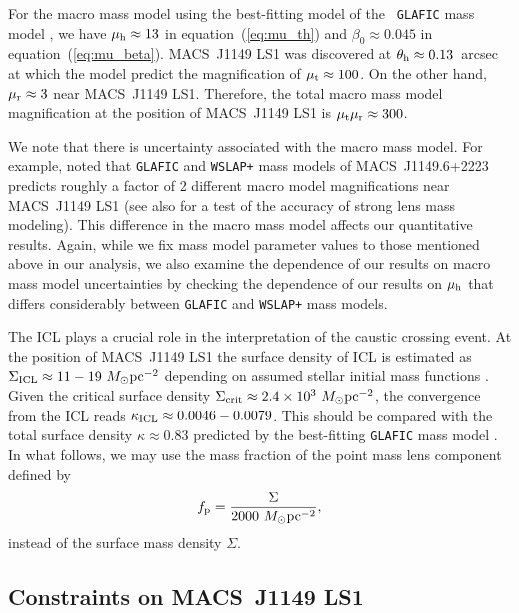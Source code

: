 \documentclass[showpacs,twocolumn,preprintnumbers,amsmath,amssymb,superscriptaddress,nofootinbib]{revtex4}
\newcommand{\morv}[1]{#1}
\begin{document}
For the macro mass model using the best-fitting model of the {\tt
  GLAFIC} mass model \cite{Oguri:2010rh,Kawamata:2015haa}, we have
$\mu_{\rm h}\approx 13$ in equation~(\ref{eq:mu_th}) and
$\beta_0\approx 0.045$ in equation~(\ref{eq:mu_beta}). MACS~J1149 LS1
was discovered at $\theta_{\rm h}\approx 0.13$~arcsec at which the
model predict the magnification of $\mu_{\rm t}\approx 100$. On the
other hand, $\mu_{\rm r}\approx 3$ near  MACS~J1149 LS1.
Therefore, the total macro mass model magnification at the position of
MACS~J1149 LS1 is $\mu_{\rm t}\mu_{\rm r}\approx 300$.

\morv{We note that there is uncertainty associated with the macro mass
  model. For example, \cite{Diego:2017drh} noted that {\tt GLAFIC} and
  {\tt WSLAP+} \cite{Diego:2015lla} mass models of MACS~J1149.6+2223
  predicts roughly a factor of 2 different macro model magnifications
  near MACS~J1149 LS1 (see also \cite{Meneghetti:2016hcr} for a test
  of the accuracy of strong lens mass modeling). This difference in
  the macro mass model affects our quantitative results. Again, while
  we fix mass model parameter values to those mentioned above in our
  analysis, we also examine the dependence of our results on macro mass
  model uncertainties by checking the dependence of our results on
  $\mu_{\rm h}$ that differs considerably between  {\tt GLAFIC} and
  {\tt WSLAP+} mass models. } 

The ICL plays a crucial role in the interpretation of the caustic
crossing event. At the position of MACS~J1149 LS1 the surface density
of ICL is estimated as $\Sigma_{\rm ICL}\approx 11-19~M_\odot{\rm
  pc}^{-2}$ depending on assumed stellar initial mass functions
\citep{Kelly:2017fps,Morishita:2017aaa}. Given the critical surface
  density $\Sigma_{\rm crit}\approx 2.4\times 10^3~M_\odot{\rm pc}^{-2}$,
the convergence from the ICL reads $\kappa_{\rm ICL}\approx 0.0046 - 0.0079$. 
This should be compared with the total surface density $\kappa\approx
0.83$ predicted by the best-fitting {\tt GLAFIC} mass model
\cite{Oguri:2010rh,Kawamata:2015haa}. In what follows, we may use the
mass fraction of the point mass lens component defined by
\begin{equation}
f_{\rm p}=\frac{\Sigma}{2000~M_\odot{\rm pc}^{-2}},
\label{eq:fp}
\end{equation}
instead of the surface mass density $\Sigma$.

\subsection{Constraints on MACS~J1149 LS1}
\label{sec:constls1}
\end{document}
